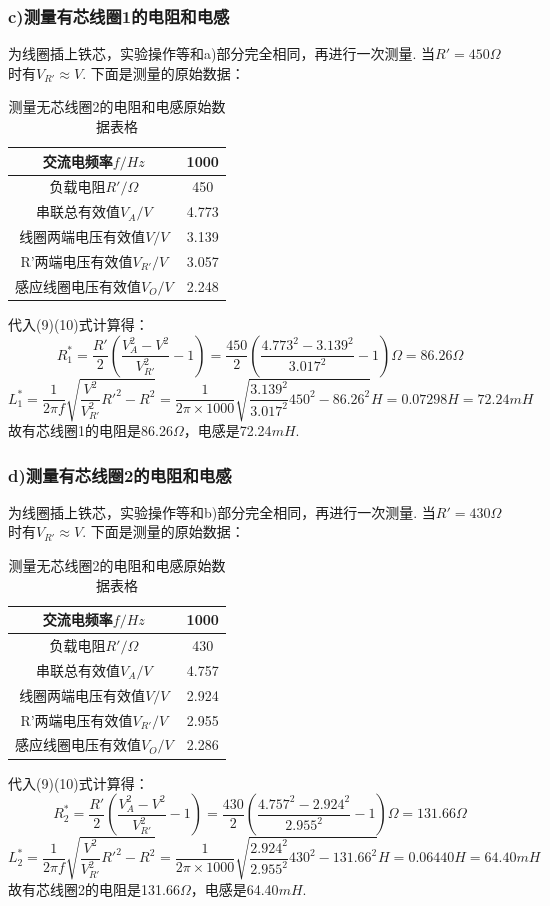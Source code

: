 \documentclass[UTF8]{ctexart}
\begin{document}
\subsubsection*{c)测量有芯线圈1的电阻和电感}
为线圈插上铁芯，实验操作等和a)部分完全相同，再进行一次测量.
当$R'=450\Omega$时有$V_{R'}\approx V$. 下面是测量的原始数据：
\begin{table}[H]\begin{center}
    \caption{测量无芯线圈2的电阻和电感原始数据表格}
    \begin{tabular}{|c|c|}
        \hline
        交流电频率$f/Hz$&1000\\
        \hline
        负载电阻$R'/\Omega$&450\\
        \hline
        串联总有效值$V_A/V$&4.773\\
        \hline
        线圈两端电压有效值$V/V$&3.139\\
        \hline
        R'两端电压有效值$V_{R'}/V$&3.057\\
        \hline
        感应线圈电压有效值$V_O/V$&2.248\\
        \hline
        \end{tabular}
\end{center}\end{table}
代入(9)(10)式计算得：
\[R_1^{*}=\frac{R'}{2}(\frac{V_A^2-V^2}{V_{R'}^2}-1)
=\frac{450}{2}(\frac{4.773^2-3.139^2}{3.017^2}-1)\Omega=86.26\Omega
\]
\[L_1^{*}=\frac{1}{2\pi f}\sqrt{\frac{V^2}{V_{R'}^2}R'^2-R^2}
=\frac{1}{2\pi\times 1000}\sqrt{\frac{3.139^2}{3.017^2}450^2-86.26^2}H=0.07298H=72.24mH
\]
故有芯线圈1的电阻是86.26$\Omega$，电感是72.24$mH$.

\subsubsection*{d)测量有芯线圈2的电阻和电感}
为线圈插上铁芯，实验操作等和b)部分完全相同，再进行一次测量.
当$R'=430\Omega$时有$V_{R'}\approx V$. 下面是测量的原始数据：
\begin{table}[H]\begin{center}
    \caption{测量无芯线圈2的电阻和电感原始数据表格}
    \begin{tabular}{|c|c|}
        \hline
        交流电频率$f/Hz$&1000\\
        \hline
        负载电阻$R'/\Omega$&430\\
        \hline
        串联总有效值$V_A/V$&4.757\\
        \hline
        线圈两端电压有效值$V/V$&2.924\\
        \hline
        R'两端电压有效值$V_{R'}/V$&2.955\\
        \hline
        感应线圈电压有效值$V_O/V$&2.286\\
        \hline
        \end{tabular}
\end{center}\end{table}
代入(9)(10)式计算得：
\[R_2^*=\frac{R'}{2}(\frac{V_A^2-V^2}{V_{R'}^2}-1)
=\frac{430}{2}(\frac{4.757^2-2.924^2}{2.955^2}-1)\Omega=131.66\Omega
\]
\[L_2^*=\frac{1}{2\pi f}\sqrt{\frac{V^2}{V_{R'}^2}R'^2-R^2}
=\frac{1}{2\pi\times 1000}\sqrt{\frac{2.924^2}{2.955^2}430^2-131.66^2}H=0.06440H=64.40mH
\]
故有芯线圈2的电阻是131.66$\Omega$，电感是64.40$mH$.
\end{document}
